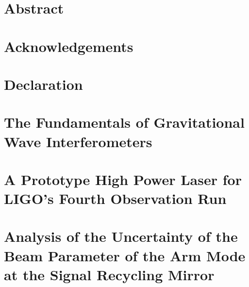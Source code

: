 \documentclass[12pt,twoside, openright]{book}
\begin{document}

\setlength{\parskip}{2em}
\chapter*{Abstract}
{}

\chapter*{Acknowledgements}
{}

%
\chapter*{Declaration}
{}

\setlength{\parskip}{0em}
\tableofcontents
\listoffigures
\listoftables
\setlength{\parskip}{2em}
%
\chapter{The Fundamentals of Gravitational Wave Interferometers}
\label{chapter:Gravitational_wave_interferometers}

\chapter{A Prototype High Power Laser for LIGO's Fourth Observation Run}
\label{chapter:TnT_lab_work}

\chapter{Analysis of the Uncertainty of the Beam Parameter of the Arm Mode at the Signal Recycling Mirror}
\label{chapter:simulation_finesse}

\end{document}
